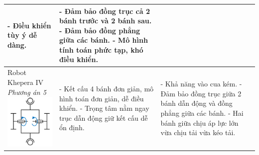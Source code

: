 \begin{longtable}{|p{4cm}|p{5cm}|p{5cm}|}
                - Điều khiển tùy ý dễ dàng. &
                - Đảm bảo đồng trục cả 2 bánh trước và 2 bánh sau. \newline
                - Đảm bảo đồng phẳng giữa các bánh. \newline
                - Mô hình tính toán phức tạp, khó điều khiển. \\ 
                \hline
                Robot Khepera IV \newline
                \textit{Phương án 5} \newline
                \includegraphics[width=2.5cm]{pictures/chapter2/chapter2_pic_5.png} &
                - Kết cấu 4 bánh đơn giản, mô hình toán đơn giản, dễ điều khiển.\newline 
                - Trọng tâm nằm ngay trục dẫn động giữ kết cấu dễ ổn định. &
                - Khả năng vào cua kém. \newline
                - Đảm bảo đồng trục giữa 2 bánh dẫn động và đồng phẳng giữa các bánh. \newline
                - Hai bánh giữa chịu áp lực lớn vừa chịu tải vừa kéo tải. \\
                \hline
                
            \end{longtable}

